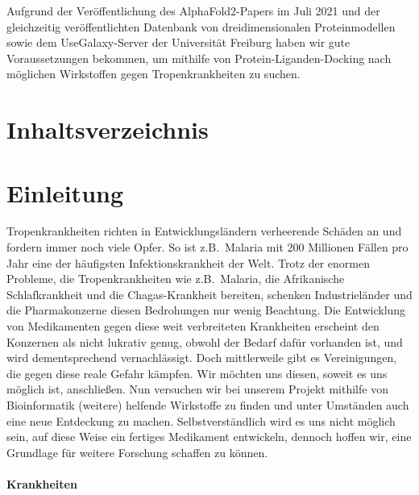 \documentclass[10pt]{article}
\begin{document}
    Aufgrund der Veröffentlichung des AlphaFold2-Papers im Juli 2021 und der gleichzeitig veröffentlichten Datenbank
    von dreidimensionalen Proteinmodellen sowie dem UseGalaxy-Server der Universität Freiburg haben wir gute
    Voraussetzungen bekommen, um mithilfe von Protein-Liganden-Docking nach möglichen Wirkstoffen gegen
    Tropenkrankheiten zu suchen.


    \section{Inhaltsverzeichnis}\label{sec:inhaltsverzeichnis}

    \tableofcontents

    \pagebreak


    \section{Einleitung}\label{sec:einleitung}

    Tropenkrankheiten richten in Entwicklungsländern verheerende Schäden an und fordern immer noch viele Opfer. So
    ist z.B.\ Malaria mit 200 Millionen Fällen pro Jahr eine der häufigsten Infektionskrankheit der Welt.
    Trotz der enormen Probleme, die Tropenkrankheiten wie z.B.\ Malaria, die Afrikanische Schlafkrankheit und die
    Chagas-Krankheit bereiten, schenken
    Industrieländer und die Pharmakonzerne diesen Bedrohungen nur wenig Beachtung.\cite{24} Die Entwicklung von
    Medikamenten gegen diese weit verbreiteten Krankheiten erscheint den Konzernen als nicht
    lukrativ genug, obwohl der Bedarf dafür vorhanden ist, und wird dementsprechend vernachlässigt.
    Doch mittlerweile gibt es Vereinigungen, die gegen diese reale Gefahr kämpfen.\cite{22}
    Wir möchten uns diesen, soweit es uns möglich ist, anschließen. Nun versuchen wir bei unserem Projekt mithilfe
    von Bioinformatik (weitere) helfende Wirkstoffe zu finden und unter Umständen auch eine neue Entdeckung zu machen.
    Selbstverständlich wird es uns nicht möglich sein, auf diese Weise ein fertiges Medikament entwickeln, dennoch
    hoffen wir, eine Grundlage für weitere Forschung schaffen zu können.

    \paragraph{Krankheiten}
\end{document}
